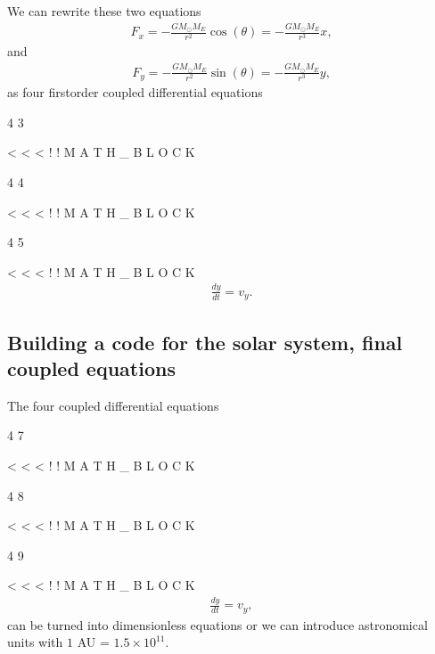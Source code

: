 \documentclass[letterpaper,10pt,english]{sphinxmanual}
\begin{document}
We can rewrite these two equations
\begin{equation*}
\begin{split}
F_{x}=-\frac{GM_{\odot}M_E}{r^2}\cos{(\theta)}=-\frac{GM_{\odot}M_E}{r^3}x,
\end{split}
\end{equation*}
and
\begin{equation*}
\begin{split}
F_{y}=-\frac{GM_{\odot}M_E}{r^2}\sin{(\theta)}=-\frac{GM_{\odot}M_E}{r^3}y,
\end{split}
\end{equation*}
as four first\sphinxhyphen{}order coupled differential equations

4
3

\textless{}
\textless{}
\textless{}
!
!
M
A
T
H
\_
B
L
O
C
K

4
4

\textless{}
\textless{}
\textless{}
!
!
M
A
T
H
\_
B
L
O
C
K

4
5

\textless{}
\textless{}
\textless{}
!
!
M
A
T
H
\_
B
L
O
C
K
\begin{equation*}
\begin{split}
\frac{dy}{dt}=v_y.
\end{split}
\end{equation*}

\subsection{Building a code for the solar system, final coupled equations}
\label{\detokenize{chapter3:building-a-code-for-the-solar-system-final-coupled-equations}}
The four coupled differential equations

4
7

\textless{}
\textless{}
\textless{}
!
!
M
A
T
H
\_
B
L
O
C
K

4
8

\textless{}
\textless{}
\textless{}
!
!
M
A
T
H
\_
B
L
O
C
K

4
9

\textless{}
\textless{}
\textless{}
!
!
M
A
T
H
\_
B
L
O
C
K
\begin{equation*}
\begin{split}
\frac{dy}{dt}=v_y,
\end{split}
\end{equation*}
can be turned into dimensionless equations or we can introduce astronomical units with \(1\) AU = \(1.5\times 10^{11}\).
\end{document}
